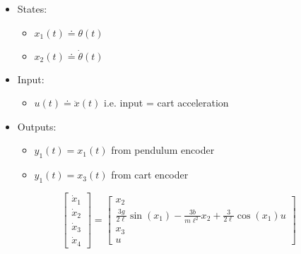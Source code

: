 \documentclass{article}
\begin{document}
\begin{itemize}
	\item States: 
	\begin{itemize}
		\item $x_1(t) \doteq \theta(t)$
		\item $x_2(t) \doteq \dot{\theta}(t)$
	\end{itemize}
	\item Input:
	\begin{itemize}
		\item $u(t) \doteq \ddot{x}(t)$ i.e. input = cart acceleration
	\end{itemize}
	\item Outputs: 
	\begin{itemize}
		\item $y_1(t) = x_1(t)$ from pendulum encoder
	   	\item $y_1(t) = x_3(t)$ from cart encoder
	\end{itemize}
\end{itemize}
\begin{equation}
\begin{bmatrix}
\dot{x}_1 \\
\dot{x}_2 \\
\dot{x}_3 \\
\dot{x}_4
\end{bmatrix} = \begin{bmatrix}
x_2\\
\frac{3g}{2\ell} \sin(x_1)    -\frac{3b}{m\ell^2}x_2              + \frac{3}{2\ell} \cos(x_1)u \\
x_3 \\
u
\end{bmatrix}
\end{equation}
	

	
\end{document}
